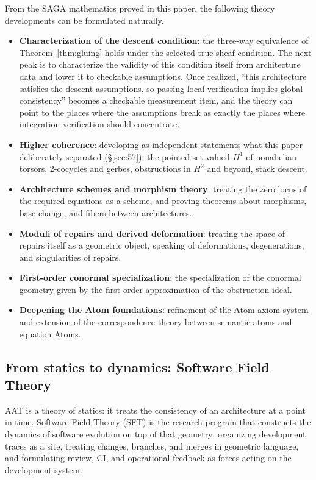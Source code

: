 From the SAGA mathematics proved in this paper, the following theory
developments can be formulated naturally.
\begin{itemize}
\item \textbf{Characterization of the descent condition}: the
three-way equivalence of Theorem~\ref{thm:gluing} holds under the
selected true sheaf condition. The next peak is to characterize the
validity of this condition itself from architecture data and lower it
to checkable assumptions. Once realized, ``this architecture satisfies
the descent assumptions, so passing local verification implies global
consistency'' becomes a checkable measurement item, and the theory can
point to the places where the assumptions break as exactly the places
where integration verification should concentrate.
\item \textbf{Higher coherence}: developing as independent statements
what this paper deliberately separated (\S\ref{sec:57}): the
pointed-set-valued $H^1$ of nonabelian torsors, 2-cocycles and gerbes,
obstructions in $H^2$ and beyond, stack descent.
\item \textbf{Architecture schemes and morphism theory}: treating the
zero locus of the required equations as a scheme, and proving theorems
about morphisms, base change, and fibers between architectures.
\item \textbf{Moduli of repairs and derived deformation}: treating the
space of repairs itself as a geometric object, speaking of
deformations, degenerations, and singularities of repairs.
\item \textbf{First-order conormal specialization}: the specialization
of the conormal geometry given by the first-order approximation of the
obstruction ideal.
\item \textbf{Deepening the Atom foundations}: refinement of the Atom
axiom system and extension of the correspondence theory between
semantic atoms and equation Atoms.
\end{itemize}

\subsection{From statics to dynamics: Software Field Theory}\label{sec:94}

AAT is a theory of statics: it treats the consistency of an architecture at a
point in time. Software Field Theory (SFT) is the research program
that constructs the dynamics of software evolution on top of that
geometry: organizing development traces as a site, treating changes,
branches, and merges in geometric language, and formulating review,
CI, and operational feedback as forces acting on the development
system.

